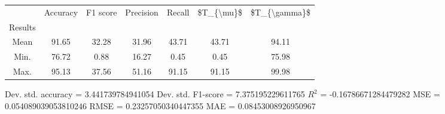 \begin{tabular}{|c|c|c|c|c|c|c|}
\toprule
{} &  Accuracy &  F1 score &  Precision &  Recall &  \$T\_\{\textbackslash mu\}\$ &  \$T\_\{\textbackslash gamma\}\$ \\
Results &           &           &            &         &            &               \\
\hline
Mean    &     91.65 &     32.28 &      31.96 &   43.71 &      43.71 &         94.11 \\
Min.    &     76.72 &      0.88 &      16.27 &    0.45 &       0.45 &         75.98 \\
Max.    &     95.13 &     37.56 &      51.16 &   91.15 &      91.15 &         99.98 \\
\bottomrule
\end{tabular}

 Dev. std. accuracy = 3.441739784941054
 Dev. std. F1-score = 7.375195229611765
 $R^2$ = -0.16786671284479282
 MSE = 0.054089039053810246
 RMSE = 0.23257050340447355
 MAE = 0.08453008926950967